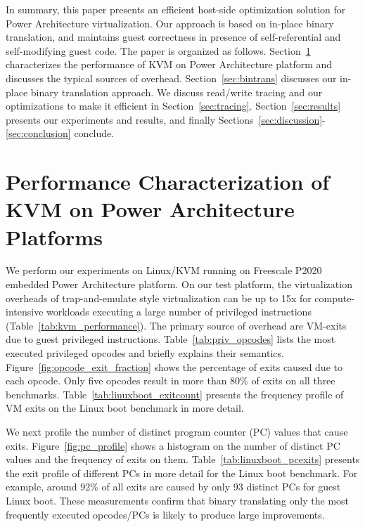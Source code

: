 \documentclass[10pt,twocolumn]{article}
\begin{document}
In summary, this paper presents an efficient host-side optimization solution for
Power Architecture virtualization. Our approach is based on in-place binary translation,
and maintains guest correctness in presence of self-referential and self-modifying
guest code.
The paper is organized as
follows. Section~\ref{sec:performance_char} characterizes the performance of
KVM on Power Architecture platform and discusses the typical sources of overhead.
Section~\ref{sec:bintrans} discusses our in-place binary translation approach.
We discuss read/write tracing and our optimizations to make
it efficient in Section~\ref{sec:tracing}.
Section~\ref{sec:results} presents our experiments and results, and
finally Sections~\ref{sec:discussion}-\ref{sec:conclusion} conclude.

\section{Performance Characterization of KVM on Power Architecture Platforms}
\label{sec:performance_char}
We perform our experiments on Linux/KVM running on Freescale P2020
embedded Power Architecture platform.
On our test platform, the virtualization overheads
of trap-and-emulate style virtualization can be up to 15x for compute-intensive
workloads executing a large number of privileged
instructions (Table~\ref{tab:kvm_performance}). The primary source of
overhead are VM-exits due to guest privileged instructions.
Table~\ref{tab:priv_opcodes} lists the most executed privileged
opcodes and briefly explains their semantics.
Figure~\ref{fig:opcode_exit_fraction} shows the percentage of exits caused
due to each opcode. Only five opcodes result in more than 80\% of exits on all
three benchmarks. Table~\ref{tab:linuxboot_exitcount} presents the frequency
profile of VM exits on the Linux boot benchmark in more detail.

We next profile the number of distinct program counter (PC) values that
cause exits. Figure~\ref{fig:pc_profile} shows a histogram on the number
of distinct PC values and the frequency of exits on them.
Table~\ref{tab:linuxboot_pcexits} presents the exit profile of different
PCs in more detail for the Linux boot benchmark. For example, around 92\% of all
exits are caused by only 93 distinct PCs for guest Linux boot. These
measurements confirm that
binary translating
only the most frequently executed opcodes/PCs is likely to produce large
improvements.
\end{document}
